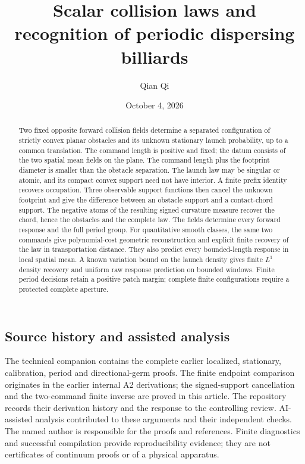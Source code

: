 \documentclass[11pt]{amsart}
\title[Scalar collision laws]{Scalar collision laws and recognition of periodic dispersing billiards}
\author{Qian Qi}
\date{October 4, 2026}
\begin{document}
\raggedbottom
\begin{abstract}
Two fixed opposite forward collision fields determine a separated
configuration of strictly convex planar obstacles and its unknown
stationary launch probability, up to a common translation. The command
length is positive and fixed; the datum consists of the two spatial
mean fields on the plane. The command length plus the footprint
diameter is smaller than the obstacle separation.
The launch law may be singular or atomic,
and its compact convex support need not have interior. A finite prefix
identity recovers occupation. Three observable support functions then
cancel the unknown footprint and give the difference between an
obstacle support and a contact-chord support. The negative atoms of
the resulting signed curvature measure recover the chord, hence the
obstacles and the complete law. The fields determine every forward
response and the full period group. For quantitative smooth classes,
the same two commands give polynomial-cost geometric reconstruction
and explicit finite recovery of the law in transportation distance.
They also predict every bounded-length response in local spatial
mean. A known variation bound on the launch density gives finite
\(L^1\) density recovery and uniform raw response prediction on bounded
windows. Finite period decisions retain a positive patch margin;
complete finite configurations require a protected complete aperture.
\end{abstract}
\maketitle
\enlargethispage{2pt}




\subsection*{Source history and assisted analysis}
The technical companion contains the complete earlier localized,
stationary, calibration, period and directional-germ proofs. The
finite endpoint comparison originates in the earlier internal A2
derivations; the signed-support cancellation and the two-command
finite inverse are proved in this article. The repository records
their derivation history and the response to the controlling review.
AI-assisted analysis contributed to these arguments and their
independent checks. The named author is responsible for the proofs
and references. Finite diagnostics and successful compilation provide
reproducibility evidence; they are not certificates of continuum
proofs or of a physical apparatus.

\end{document}
